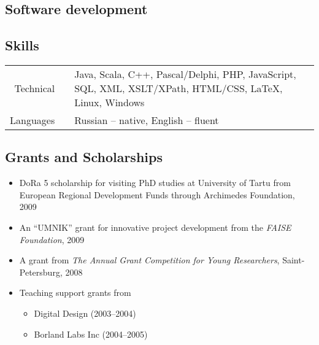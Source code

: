 \documentclass[a4paper, 12pt]{article}
\begin{document}
\subsection*{Software development}

\subsection*{Skills}

\begin{tabular}{ r l p{350pt} }
Technical&&Java, Scala, C++, Pascal/Delphi, PHP, JavaScript, SQL, XML, XSLT/XPath, HTML/CSS, \LaTeX, Linux, Windows\\
Languages&&Russian -- native, English -- fluent\\
\end{tabular}

\subsection*{Grants and Scholarships}
\begin{itemize}
	\item DoRa 5 scholarship for visiting PhD studies at University of Tartu from European Regional Development Funds through Archimedes Foundation, 2009
	\item An ``UMNIK'' grant for innovative project development from the {\it FAISE Foundation}, 2009
	\item A grant from {\it The Annual Grant Competition for Young Researchers}, Saint-Petersburg, 2008
	\item {Teaching support grants from 
		\begin{itemize}
			\item Digital Design (2003--2004)  
			\item Borland Labs Inc (2004--2005) 
		\end{itemize}}
\end{itemize}
\end{document}
